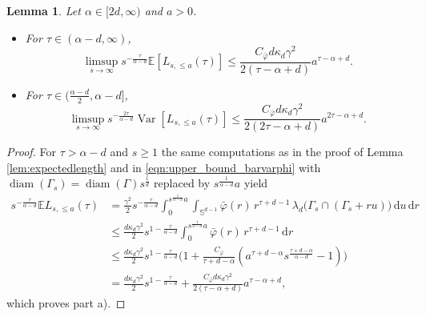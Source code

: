 \documentclass{article}
\newtheorem{lemma}[theorem]{Lemma}
\theoremstyle{definition}
\numberwithin{equation}{section}
\theoremstyle{remark}
\begin{document}
\begin{lemma}\label{lem:truncation_edge_length}
Let $\alpha\in[2d,\infty)$ and $a>0$.
\begin{itemize}
\item [a)] For $\tau\in(\alpha-d,\infty)$,
$$
\limsup_{s\to \infty} s^{-\frac{\tau}{\alpha-d}} \mathbb{E}[L_{s,\leq a}(\tau)] \leq \frac{C_{\bar{\varphi}}d\kappa_d\gamma^2 }{2(\tau-\alpha+d)} a^{\tau-\alpha+d}.
$$
\item [b)] For $\tau\in(\frac{\alpha-d}{2},\alpha-d]$,
$$\limsup_{s\to\infty} s^{-\frac{2\tau}{\alpha-d}} \operatorname{Var}[L_{s,\leq a}(\tau)] \leq \frac{C_{\bar{\varphi}}d\kappa_d\gamma^2 }{2(2\tau-\alpha+d)} a^{2\tau-\alpha+d}.$$
\end{itemize}
\end{lemma}

\begin{proof}
For $\tau>\alpha-d$ and $s\geq 1$ the same computations as in the proof of Lemma \ref{lem:expectedlength} and in \eqref{eqn:upper_bound_barvarphi} with $\operatorname{diam}(\Gamma_s)=\operatorname{diam}(\Gamma)s^{\frac{1}{d}}$ replaced by $s^{\frac{1}{\alpha-d}}a$ yield
\begin{align*}
s^{-\frac{\tau}{\alpha-d}}\mathbb{E} L_{s,\leq a}(\tau) & = \frac{\gamma^2}{2} s^{-\frac{\tau}{\alpha-d}} \int_{0}^{s^{\frac{1}{\alpha-d}}a}\int_{\mathbb{S}^{d-1}} 
       \bar{\varphi}(r)\,r^{\tau+d-1}\,
       \lambda_d\!\big(\Gamma_s\cap (\Gamma_s+ru)\big)\,
        \mathrm{d}u\, \mathrm{d}r \\
        & \le \frac{d\kappa_d\gamma^2}{2} s^{1-\frac{\tau}{\alpha-d}} \int_{0}^{s^{\frac{1}{\alpha-d}}a} 
       \bar{\varphi}(r)\,r^{\tau+d-1} \, \mathrm{d}r\\
       & \le \frac{d\kappa_d\gamma^2}{2} s^{1-\frac{\tau}{\alpha-d}} 
    \bigg( 1 + \frac{C_{\bar{\varphi}}}{\tau+d-\alpha}(a^{\tau+d-\alpha} s^{\frac{\tau+d-\alpha}{\alpha-d}}-1)\bigg)\\
       & = \frac{d\kappa_d\gamma^2}{2} s^{1-\frac{\tau}{\alpha-d}}+\frac{C_{\bar{\varphi}}d\kappa_d\gamma^2}{2(\tau-\alpha+d)} a^{\tau-\alpha+d},
\end{align*}
which proves part a).


\end{proof}
\end{document}

